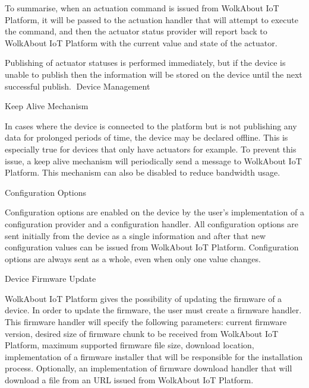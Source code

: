 To summarise, when an actuation command is issued from Wolk\+About IoT Platform, it will be passed to the actuation handler that will attempt to execute the command, and then the actuator status provider will report back to Wolk\+About IoT Platform with the current value and state of the actuator.

Publishing of actuator statuses is performed immediately, but if the device is unable to publish then the information will be stored on the device until the next successful publish. Device Management

Keep Alive Mechanism

In cases where the device is connected to the platform but is not publishing any data for prolonged periods of time, the device may be declared offline. This is especially true for devices that only have actuators for example. To prevent this issue, a keep alive mechanism will periodically send a message to Wolk\+About IoT Platform. This mechanism can also be disabled to reduce bandwidth usage.

Configuration Options

Configuration options are enabled on the device by the user’s implementation of a configuration provider and a configuration handler. All configuration options are sent initially from the device as a single information and after that new configuration values can be issued from Wolk\+About IoT Platform. Configuration options are always sent as a whole, even when only one value changes.

Device Firmware Update

Wolk\+About IoT Platform gives the possibility of updating the firmware of a device. In order to update the firmware, the user must create a firmware handler. This firmware handler will specify the following parameters\+: current firmware version, desired size of firmware chunk to be received from Wolk\+About IoT Platform, maximum supported firmware file size, download location, implementation of a firmware installer that will be responsible for the installation process. Optionally, an implementation of firmware download handler that will download a file from an U\+RL issued from Wolk\+About IoT Platform. 